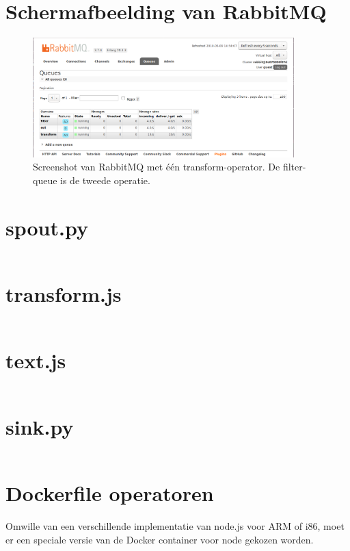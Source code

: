 \documentclass[twocolumn, a4paper]{article}
\begin{document}
\section{Schermafbeelding van RabbitMQ}
\begin{figure}[htb]
    \centering
    \includegraphics[width=0.9\textwidth]{main_1_2}
    \caption{Screenshot van RabbitMQ met één transform-operator. De filter-queue is de tweede operatie.}\label{fig:dashboard}
\end{figure}

\newpage

\section{spout.py}
\inputminted[breaklines=true]{python}{code/spout.py}

\section{transform.js}
\inputminted[breaklines=true]{javascript}{code/transform.js}

\section{text.js}
\inputminted[breaklines=true]{javascript}{code/filter.js}


\section{sink.py}
\inputminted[breaklines=true]{python}{code/output.py}

\section{Dockerfile operatoren}
Omwille van een verschillende implementatie van node.js voor ARM of i86, moet er een speciale versie van de Docker container voor node gekozen worden. 
\inputminted[breaklines=true]{docker}{code/Dockerfile}
\end{document}
